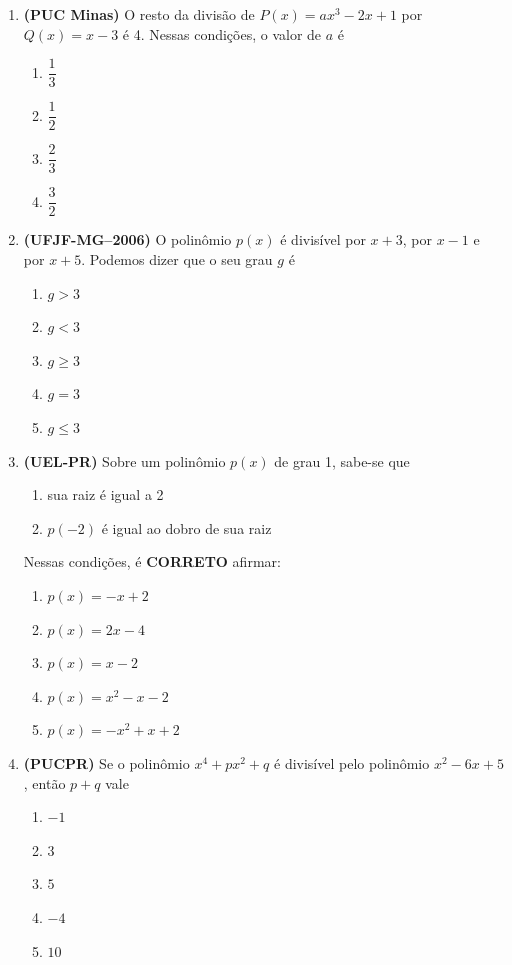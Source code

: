 \documentclass[12pt,a4paper]{article}
\begin{document}
\begin{enumerate}[leftmargin=*, itemsep=0.35cm]
  
    \item \textbf{(PUC Minas)} O resto da divisão de $P(x) = ax^3 - 2x + 1$ por $Q(x) = x - 3$ é 4. Nessas condições, o valor de $a$ é
    \begin{enumerate}[label=\Alph*)]
        \item $\dfrac{1}{3}$
        \item $\dfrac{1}{2}$
        \item $\dfrac{2}{3}$
        \item $\dfrac{3}{2}$
    \end{enumerate}

    \item \textbf{(UFJF-MG--2006)} O polinômio $p(x)$ é divisível por $x + 3$, por $x - 1$ e por $x + 5$. Podemos dizer que o seu grau $g$ é
    \begin{enumerate}[label=\Alph*)]
        \item $g > 3$
        \item $g < 3$
        \item $g \ge 3$
        \item $g = 3$
        \item $g \le 3$
    \end{enumerate}

    \item \textbf{(UEL-PR)} Sobre um polinômio $p(x)$ de grau 1, sabe-se que
    \begin{enumerate}[label=\Roman*.]
        \item sua raiz é igual a 2
        \item $p(-2)$ é igual ao dobro de sua raiz
    \end{enumerate}
    Nessas condições, é \textbf{CORRETO} afirmar:
    \begin{enumerate}[label=\Alph*)]
        \item $p(x) = -x + 2$
        \item $p(x) = 2x - 4$
        \item $p(x) = x - 2$
        \item $p(x) = x^2 - x - 2$
        \item $p(x) = -x^2 + x + 2$
    \end{enumerate}

    \setcounter{enumii}{4} %
    \item \textbf{(PUCPR)} Se o polinômio $x^4 + px^2 + q$ é divisível pelo polinômio $x^2 - 6x + 5$, então $p + q$ vale
    \begin{enumerate}[label=\Alph*)]
        \item $-1$
        \item $3$
        \item $5$
        \item $-4$
        \item $10$
    \end{enumerate}


\end{enumerate}
\end{document}
